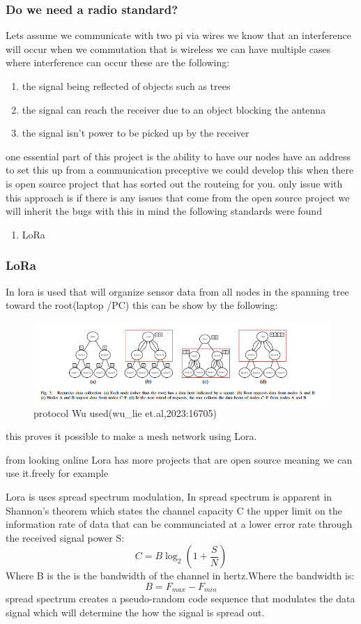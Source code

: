 \subsubsection{Do we need a radio standard?}
Lets assume we communicate with two pi via wires  we know that an interference will occur when  we  commutation that is wireless
we can have multiple cases where interference can  occur these are  the following:
\begin{enumerate}
    \item the signal being reflected of objects such as  trees
    \item the signal can reach the  receiver due to an object blocking the antenna
    \item the signal isn't  power to be picked up by the receiver
\end{enumerate}
one essential part of this project is the  ability to have  our nodes have an address to set this up
from a communication preceptive we could develop this when there is open source project that has sorted out the routeing for  you.
only issue with this approach is if there is any issues that come from the open source project we will inherit the bugs
with this in mind the following standards were found
\newpage
\begin{enumerate}
    \item LoRa
\end{enumerate}
\subsubsection{LoRa}

In \cite{Wu_Liebeherr_2023} lora is used that will organize sensor
data from all nodes in the spanning tree toward the root(laptop /PC) this can be show by the  following:
\begin{figure}[h!]
    \centering
    \includegraphics[width=0.5\linewidth]{Images/lora_example_routing_proto.png}
    \caption{protocol Wu used(wu\_lie et.al,2023:16705)}
    \label{protocol Wu used(wu_lie et.al,2023:16705)}
\end{figure}  
this proves it possible  to make a  mesh network using Lora.
\par 
from looking online Lora has more projects that are open source meaning we can use it.freely for example 
\par
Lora is uses spread spectrum modulation, In \cite{2003_Information_2023} spread spectrum is apparent in Shannon's theorem which states the channel capacity C the upper limit on the information rate of data that can be communciated at a lower error rate through the received signal power S:
$$C=B\log_2(1+\frac{S}{N})$$
Where B is the is the bandwidth of the channel in hertz.Where the bandwidth is:
$$B=F_{max}-F_{min}$$
spread spectrum  creates a pseudo-random code sequence that modulates the data signal  which will determine the  how  the signal is  spread out.

